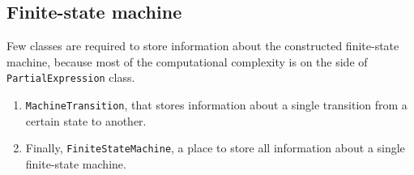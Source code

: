 \documentclass{article}
\begin{document}
\newpage

\subsection{Finite-state machine}
Few classes are required to store information about the constructed finite-state machine, because
most of the computational complexity is on the side of \verb|PartialExpression| class.

\begin{enumerate}

  \item \verb|MachineTransition|, that stores information about a single transition from a certain
  state to another.

  \item Finally, \verb|FiniteStateMachine|, a place to store all information about a single
  finite-state machine.

\end{enumerate}
\end{document}
